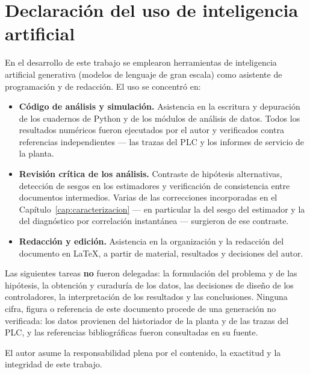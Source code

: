 \chapter*{Declaración del uso de inteligencia artificial}

En el desarrollo de este trabajo se emplearon herramientas de inteligencia
artificial generativa (modelos de lenguaje de gran escala) como asistente de
programación y de redacción. El uso se concentró en:

\begin{itemize}
  \item \textbf{Código de análisis y simulación.} Asistencia en la escritura y
  depuración de los cuadernos de Python y de los módulos de análisis de datos.
  Todos los resultados numéricos fueron ejecutados por el autor y verificados
  contra referencias independientes --- las trazas del PLC y los informes de
  servicio de la planta.
  \item \textbf{Revisión crítica de los análisis.} Contraste de hipótesis
  alternativas, detección de sesgos en los estimadores y verificación de
  consistencia entre documentos intermedios. Varias de las correcciones
  incorporadas en el Capítulo~\ref{cap:caracterizacion} --- en particular la del
  sesgo del estimador y la del diagnóstico por correlación instantánea ---
  surgieron de ese contraste.
  \item \textbf{Redacción y edición.} Asistencia en la organización y la
  redacción del documento en \LaTeX, a partir de material, resultados y
  decisiones del autor.
\end{itemize}

Las siguientes tareas \textbf{no} fueron delegadas: la formulación del
problema y de las hipótesis, la obtención y curaduría de los datos, las
decisiones de diseño de los controladores, la interpretación de los resultados
y las conclusiones. Ninguna cifra, figura o referencia de este documento
procede de una generación no verificada: los datos provienen del historiador
de la planta y de las trazas del PLC, y las referencias bibliográficas fueron
consultadas en su fuente.

El autor asume la responsabilidad plena por el contenido, la exactitud y la
integridad de este trabajo.
